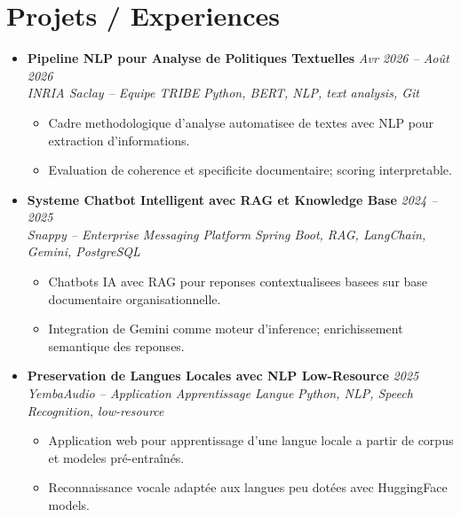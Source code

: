 \documentclass[a4paper,11pt]{article}
\begin{document}
\section{Projets / Experiences}
\begin{itemize}[leftmargin=*, label={-}]

\item \textbf{Pipeline NLP pour Analyse de Politiques Textuelles} \hfill \textit{Avr 2026 -- Ao\^ut 2026} \\
\textit{INRIA Saclay -- Equipe TRIBE} \hfill \textit{Python, BERT, NLP, text analysis, Git}
\vspace{-2pt}
    \begin{itemize}[leftmargin=0.4cm, nosep, label=\tiny$\bullet$]
        \item \small{Cadre methodologique d'analyse automatisee de textes avec NLP pour extraction d'informations.}
        \item \small{Evaluation de coherence et specificite documentaire; scoring interpretable.}
    \end{itemize}
\vspace{3pt}

\item \textbf{Systeme Chatbot Intelligent avec RAG et Knowledge Base} \hfill \textit{2024 -- 2025} \\
\textit{Snappy -- Enterprise Messaging Platform} \hfill \textit{Spring Boot, RAG, LangChain, Gemini, PostgreSQL}
\vspace{-2pt}
    \begin{itemize}[leftmargin=0.4cm, nosep, label=\tiny$\bullet$]
        \item \small{Chatbots IA avec RAG pour reponses contextualisees basees sur base documentaire organisationnelle.}
        \item \small{Integration de Gemini comme moteur d'inference; enrichissement semantique des reponses.}
    \end{itemize}
\vspace{3pt}

\item \textbf{Preservation de Langues Locales avec NLP Low-Resource} \hfill \textit{2025} \\
\textit{YembaAudio -- Application Apprentissage Langue} \hfill \textit{Python, NLP, Speech Recognition, low-resource}
\vspace{-2pt}
    \begin{itemize}[leftmargin=0.4cm, nosep, label=\tiny$\bullet$]
        \item \small{Application web pour apprentissage d'une langue locale a partir de corpus et modeles pré-entraînés.}
        \item \small{Reconnaissance vocale adaptée aux langues peu dotées avec HuggingFace models.}
    \end{itemize}
\vspace{3pt}


\end{itemize}
\end{document}
